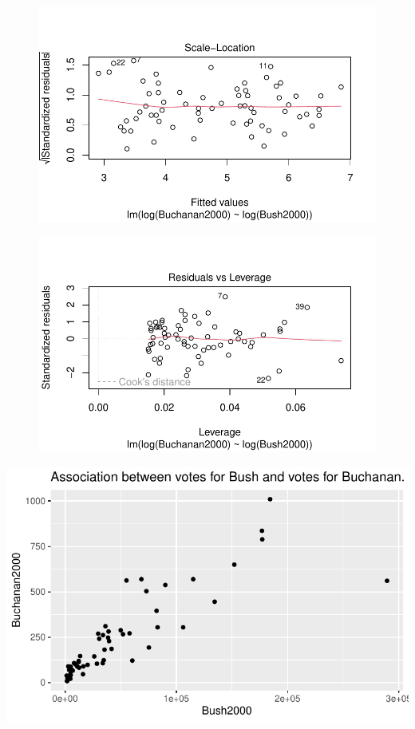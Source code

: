 \documentclass[
  letterpaper,
  DIV=11,
  numbers=noendperiod]{scrartcl}
\begin{document}
\begin{figure}[H]

{\centering \includegraphics{case_study_1_files/figure-pdf/unnamed-chunk-5-3.pdf}

}

\end{figure}

\begin{figure}[H]

{\centering \includegraphics{case_study_1_files/figure-pdf/unnamed-chunk-5-4.pdf}

}

\end{figure}

\includegraphics{case_study_1_files/figure-pdf/unnamed-chunk-6-1.pdf}
\end{document}
